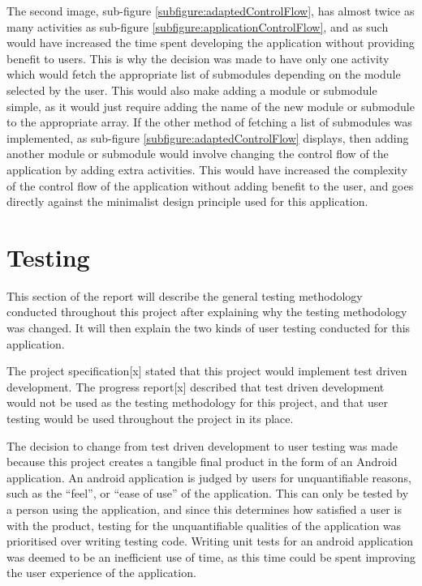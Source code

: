 \documentclass{article}
\begin{document}
The second image, sub-figure \ref{subfigure:adaptedControlFlow}, has almost twice as many activities as sub-figure \ref{subfigure:applicationControlFlow}, and as such would have increased the time spent developing the application without providing benefit to users. This is why the decision was made to have only one activity which would fetch the appropriate list of submodules depending on the module selected by the user. This would also make adding a module or submodule simple, as it would just require adding the name of the new module or submodule to the appropriate array. If the other method of fetching a list of submodules was implemented, as sub-figure \ref{subfigure:adaptedControlFlow} displays, then adding another module or submodule would involve changing the control flow of the application by adding extra activities. This would have increased the complexity of the control flow of the application without adding benefit to the user, and goes directly against the minimalist design principle used for this application. \par


\section{Testing}
\label{section:testing}

This section of the report will describe the general testing methodology conducted throughout this project after explaining why the testing methodology was changed. It will then explain the two kinds of user testing conducted for this application. \par 

The project specification[x] stated that this project would implement test driven development. The progress report[x] described that test driven development would not be used as the testing methodology for this project, and that user testing would be used throughout the project in its place. \par

The decision to change from test driven development to user testing was made because this project creates a tangible final product in the form of an Android application. An android application is judged by users for unquantifiable reasons, such as the ``feel'', or ``ease of use'' of the application. This can only be tested by a person using the application, and since this determines how satisfied a user is with the product, testing for the unquantifiable qualities of the application was prioritised over writing testing code. Writing unit tests for an android application was deemed to be an inefficient use of time, as this time could be spent improving the user experience of the application. \par
\end{document}
